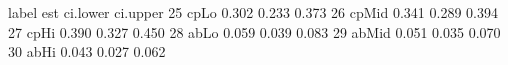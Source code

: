 \begin{Schunk}
\begin{Soutput}
   label   est ci.lower ci.upper
25  cpLo 0.302    0.233    0.373
26 cpMid 0.341    0.289    0.394
27  cpHi 0.390    0.327    0.450
28  abLo 0.059    0.039    0.083
29 abMid 0.051    0.035    0.070
30  abHi 0.043    0.027    0.062
\end{Soutput}
\end{Schunk}
